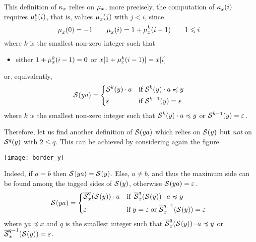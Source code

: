 This definition of \(\kappa_{x}\) relies on
\(\mu_{x}\), more precisely, the computation of
\(\kappa_{x}^{}(i)\) requires \(\mu_{x}^{p}(i)\), that is,
values \(\mu_{x}^{}(j)\) with \(j < i\), since
\[
\mu_{x}^{}(0) = -1 
\qquad \mu_{x}^{}(i) = 1 + \mu_{x}^{k}(i-1)
\qquad 1 \leqslant i
\]
where \(k\) is the smallest non-zero integer such that
\begin{itemize}

  \item either \(1 + \mu_{x}^{k}(i-1) = 0\) or
    \(x[1+\mu_{x}^{k}(i-1)] = x[i]\)

\end{itemize}
or, equivalently,
\[
\mathcal{S}^{}(ya) = 
\left\{
  \begin{aligned}
   & \mathcal{S}^{k}(y) \cdot a 
   && \text{if} \; \mathcal{S}^{k}(y) \cdot a \preccurlyeq y\\
   & \varepsilon 
   && \text{if} \; \mathcal{S}^{k-1}(y) = \varepsilon
  \end{aligned}
\right. 
\]
where \(k\) is the smallest non-zero integer such that \(\mathcal{S}^{k}(y)
\cdot a \preccurlyeq y\) or \(\mathcal{S}^{k-1}(y) = \varepsilon\).

Therefore, let us find another definition of \(\mathcal{S}^{}(ya)\) which
relies on \(\mathcal{S}^{}(y)\) but \emph{not} on
\(\mathcal{S}^{q}(y)\) with \(2 \leqslant q\). This can be
achieved by considering again the figure
\begin{center}
\texttt{[image: border\_y]}
\end{center}
Indeed, if \(a = b\) then \(\mathcal{S}^{}(ya) = \mathcal{S}^{}(y)\). Else, \(a
\neq b\), and thus the maximum side can be found among the tagged
sides of \(\mathcal{S}^{}(y)\), otherwise \(\mathcal{S}^{}(ya) = \varepsilon\).
\[
\mathcal{S}^{}(ya) = \left\{
\begin{aligned}
 & \overline{\mathcal{S}}_{x}^{q}(\mathcal{S}^{}(y)) \cdot a
 &&\text{if} \;\, \overline{\mathcal{S}}_{x}^{q}(\mathcal{S}^{}(y)) \cdot a
 \preccurlyeq y\\
 & \varepsilon
 &&\text{if} \; y = \varepsilon \;\text{or}\;
    \overline{\mathcal{S}}_{x}^{q-1}(\mathcal{S}^{}(y)) = \varepsilon
\end{aligned}
\right.
\]
where \(ya \preccurlyeq x\) and \(q\) is the smallest integer such
that \(\overline{\mathcal{S}}_{x}^{q}(\mathcal{S}^{}(y)) \cdot a \preccurlyeq y\) or
\(\overline{\mathcal{S}}_{x}^{q-1}(\mathcal{S}^{}(y)) = \varepsilon\).

